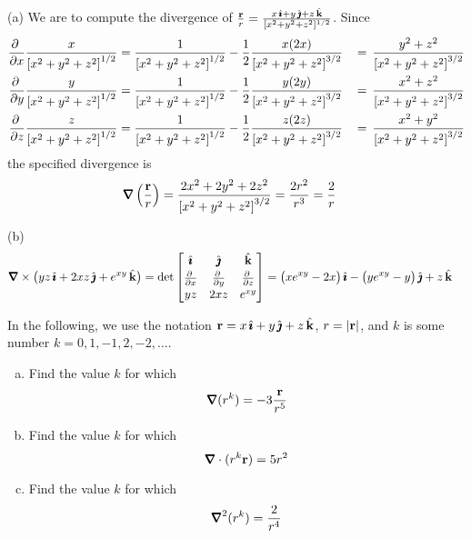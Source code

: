 \begin{solution} (a)
 We are to compute the divergence of $\frac{\mathbf{r}}{r}
=\frac{x\,\hat{\pmb{\imath}}+y\,\hat{\pmb{\jmath}}+z\,\hat{\mathbf{k}}}{[x^2+y^2+z^2]^{1/2}}$. Since
\begin{alignat*}{3}
\pdiff{}{x}\frac{x}{{[x^2+y^2+z^2]}^{1/2}}
&=\frac{1}{{[x^2+y^2+z^2]}^{1/2}} 
            -\frac{1}{2}\frac{x(2x)}{{[x^2+y^2+z^2]}^{3/2}}
&\,=\,\frac{y^2+z^2}{{[x^2+y^2+z^2]}^{3/2}}
\\
\pdiff{}{y}\frac{y}{{[x^2+y^2+z^2]}^{1/2}}
&=\frac{1}{{[x^2+y^2+z^2]}^{1/2}} 
            -\frac{1}{2}\frac{y(2y)}{{[x^2+y^2+z^2]}^{3/2}}
&\,=\,\frac{x^2+z^2}{{[x^2+y^2+z^2]}^{3/2}}
\\
\pdiff{}{z}\frac{z}{{[x^2+y^2+z^2]}^{1/2}}
&=\frac{1}{{[x^2+y^2+z^2]}^{1/2}} 
            -\frac{1}{2}\frac{z(2z)}{{[x^2+y^2+z^2]}^{3/2}}
&\,=\,\frac{x^2+y^2}{{[x^2+y^2+z^2]}^{3/2}}
\end{alignat*}
the specified divergence is
\begin{align*}
\vnabla\left(\frac{\vr}{r}\right) &= \frac{2x^2+2y^2+2z^2}{{[x^2+y^2+z^2]}^{3/2}}
                               =\frac{2r^2}{r^3}
                               =\frac{2}{r}
\end{align*}

(b)
\begin{align*}
\vnabla\times\big(yz\,\hi + 2xz\,\hj + e^{xy}\,\hk\big)
&=\det\left[\begin{matrix}\hi&\hj&\hk\\[0.03in] 
     \pdiff{}{x}&
        \pdiff{}{y}&
        \pdiff{}{z}\\[0.03in]
yz&2xz&e^{xy}\end{matrix}\right]
=\big(xe^{xy}-2x\big)\,\hi-\big(ye^{xy}-y\big)\,\hj+z\,\hk
\end{align*}

\end{solution}


\begin{question}[M317 2008A] %
In the following, we use the notation 
$\mathbf{r} = x\,\hat{\pmb{\imath}} + y\,\hat{\pmb{\jmath}} + z\,\hat{\mathbf{k}}$, $r = |\mathbf{r}|$, and $k$ is some number
$k = 0, 1, -1, 2, -2, \dots$.
\begin{enumerate}[(a)]
\item
Find the value $k$ for which
\begin{equation*}
\vnabla (r^k) = -3\frac{\vr}{r^5}
\end{equation*}
\item
Find the value $k$ for which
\begin{equation*}
\vnabla  \cdot (r^k\vr) = 5r^2 
\end{equation*}
\item
Find the value $k$ for which
\begin{equation*}
\vnabla^2 (r^k) = \frac{2}{r^4}
\end{equation*}
\end{enumerate}
\end{question}

